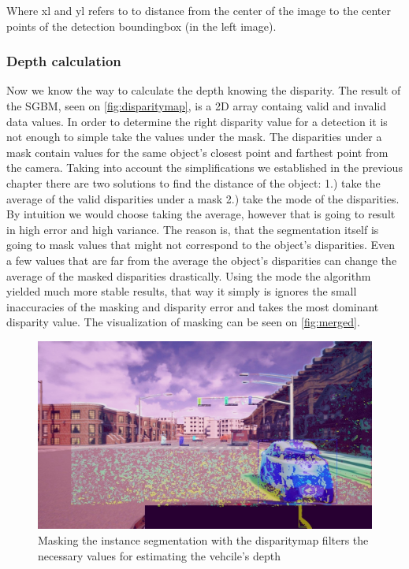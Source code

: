 Where xl and yl refers to to distance from the center of the image to the center
points of the detection boundingbox (in the left image). 

\subsubsection{Depth calculation}
Now we know the way to calculate the depth knowing the disparity. The result of
the SGBM, seen on \autoref{fig:disparitymap}, is a 2D array containg valid and
invalid data values. In order to determine the right disparity value
for a detection it is not enough to simple take the values under the mask. The
disparities under a mask contain values for the same object's closest point and
farthest point from the camera. Taking into account the simplifications we
established in the previous chapter there are two solutions to find the distance
of the object: 1.) take the average of the valid disparities under a mask 2.)
take the mode of the disparities. By intuition we would choose taking the
average, however that is going to result in high error and high variance. The
reason is, that the segmentation itself is going to mask values that might not
correspond to the object's disparities. Even a few values that are far from the
average the object's disparities can change the average of the masked
disparities drastically. Using the mode the algorithm yielded much more stable
results, that way it simply is ignores the small inaccuracies of the masking and
disparity error and takes the most dominant disparity value. The visualization
of masking can be seen on \autoref{fig:merged}.



\begin{figure}[!ht]
    \centering
    \includegraphics[width=150mm, keepaspectratio]{figures/335merged.jpg}
    \caption{Masking the instance segmentation with the disparitymap filters the necessary values for estimating the vehcile's depth}
    \label{fig:merged}
\end{figure}



